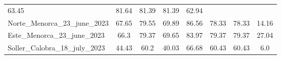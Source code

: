 \begin{table}[H]
{\begin{tabular}{lccccccc}
            63.45                                  & 81.64     &
            81.39                                  & 81.39     & 62.94
            \\
            Norte\_Menorca\_23\_june\_2023         & 67.65     & 79.55      &
            69.89                                  & 86.56     &
            78.33                                  & 78.33     & 14.16
            \\
            Este\_Menorca\_23\_june\_2023          & 66.3      & 79.37      &
            69.65                                  & 83.97     &
            79.37                                  & 79.37     & 27.04
            \\
            Soller\_Calobra\_18\_july\_2023        & 44.43     & 60.2       &
            40.03                                  & 66.68     &
            60.43                                  & 60.43     & 6.0
            \\ \bottomrule
        \end{tabular}%
    }
\end{table}

